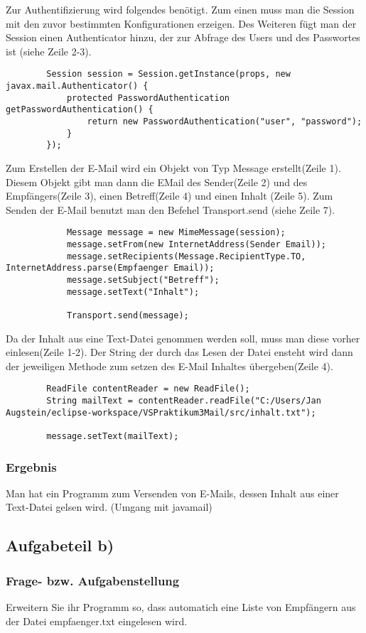 Zur Authentifizierung wird folgendes benötigt. Zum einen muss man die Session mit den zuvor bestimmten Konfigurationen erzeigen. Des Weiteren fügt man der Session einen Authenticator hinzu, der zur Abfrage des Users und des Passwortes ist (siehe Zeile 2-3).
\begin{lstlisting}
		Session session = Session.getInstance(props, new javax.mail.Authenticator() {
			protected PasswordAuthentication getPasswordAuthentication() {
				return new PasswordAuthentication("user", "password");
			}
		});
\end{lstlisting}


Zum Erstellen der E-Mail wird ein Objekt von Typ Message erstellt(Zeile 1). Diesem Objekt gibt man dann die EMail des Sender(Zeile 2) und des Empfängers(Zeile 3), einen Betreff(Zeile 4) und einen Inhalt (Zeile 5). Zum Senden der E-Mail benutzt man den Befehel Transport.send (siehe Zeile 7).
\begin{lstlisting}
			Message message = new MimeMessage(session);
			message.setFrom(new InternetAddress(Sender Email));
			message.setRecipients(Message.RecipientType.TO, InternetAddress.parse(Empfaenger Email));
			message.setSubject("Betreff");
			message.setText("Inhalt");
			
			Transport.send(message);
\end{lstlisting}


Da der Inhalt aus eine Text-Datei genommen werden soll, muss man diese vorher einlesen(Zeile 1-2). Der String der durch das Lesen der Datei ensteht wird dann der jeweiligen Methode zum setzen des E-Mail Inhaltes übergeben(Zeile 4).
\begin{lstlisting}
		ReadFile contentReader = new ReadFile();
		String mailText = contentReader.readFile("C:/Users/Jan Augstein/eclipse-workspace/VSPraktikum3Mail/src/inhalt.txt");
		
		message.setText(mailText);
\end{lstlisting}

\subsubsection{Ergebnis}
Man hat ein Programm zum Versenden von E-Mails, dessen Inhalt aus einer Text-Datei gelsen wird. (Umgang mit javamail)

\subsection{Aufgabeteil b)}
\subsubsection{Frage- bzw. Aufgabenstellung}
 Erweitern Sie ihr Programm so, dass automatich eine Liste von Empfängern aus der Datei empfaenger.txt eingelesen wird.
 
